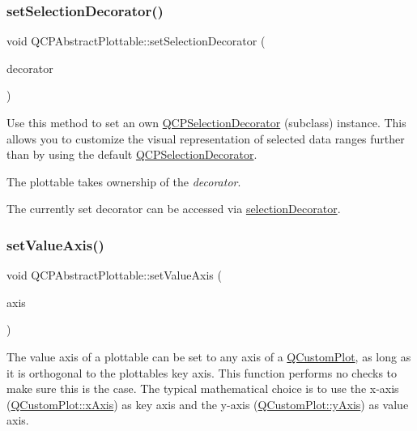 \subsubsection{\texorpdfstring{set\+Selection\+Decorator()}{setSelectionDecorator()}}
{\footnotesize\ttfamily void Q\+C\+P\+Abstract\+Plottable\+::set\+Selection\+Decorator (\begin{DoxyParamCaption}\item[{\hyperlink{classQCPSelectionDecorator}{Q\+C\+P\+Selection\+Decorator} $\ast$}]{decorator }\end{DoxyParamCaption})}

Use this method to set an own \hyperlink{classQCPSelectionDecorator}{Q\+C\+P\+Selection\+Decorator} (subclass) instance. This allows you to customize the visual representation of selected data ranges further than by using the default \hyperlink{classQCPSelectionDecorator}{Q\+C\+P\+Selection\+Decorator}.

The plottable takes ownership of the {\itshape decorator}.

The currently set decorator can be accessed via \hyperlink{classQCPAbstractPlottable_a7861518e47ca0c6a0c386032c2db075e}{selection\+Decorator}. \mbox{\label{classQCPAbstractPlottable_a71626a07367e241ec62ad2c34baf21cb}} 
\subsubsection{\texorpdfstring{set\+Value\+Axis()}{setValueAxis()}}
{\footnotesize\ttfamily void Q\+C\+P\+Abstract\+Plottable\+::set\+Value\+Axis (\begin{DoxyParamCaption}\item[{\hyperlink{classQCPAxis}{Q\+C\+P\+Axis} $\ast$}]{axis }\end{DoxyParamCaption})}

The value axis of a plottable can be set to any axis of a \hyperlink{classQCustomPlot}{Q\+Custom\+Plot}, as long as it is orthogonal to the plottable\textquotesingle{}s key axis. This function performs no checks to make sure this is the case. The typical mathematical choice is to use the x-\/axis (\hyperlink{classQCustomPlot_a9a79cd0158a4c7f30cbc702f0fd800e4}{Q\+Custom\+Plot\+::x\+Axis}) as key axis and the y-\/axis (\hyperlink{classQCustomPlot_af6fea5679725b152c14facd920b19367}{Q\+Custom\+Plot\+::y\+Axis}) as value axis.

